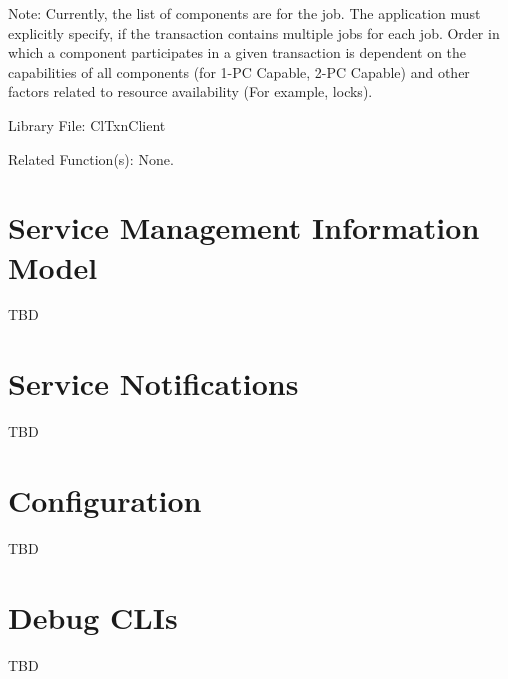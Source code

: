 \begin{flushleft}
\begin{Desc}
\end{Desc}
\begin{Desc}
\item[Note:]Currently, the list of components are for the job. The application must explicitly specify, if the transaction contains
multiple jobs for each job. Order in which a component participates in a given transaction is dependent on the capabilities of all components (for 1-PC Capable, 
2-PC Capable) and other factors related to resource availability (For example, locks).
\end{Desc}
\begin{Desc}
\item[Library File:]Cl\-Txn\-Client\end{Desc}
\begin{Desc}
\item[Related Function(s):]None. \end{Desc}

\chapter{Service Management Information Model}
TBD

\chapter{Service Notifications}
TBD

\chapter{Configuration}
TBD


\chapter{Debug CLIs}
TBD

\end{flushleft}
